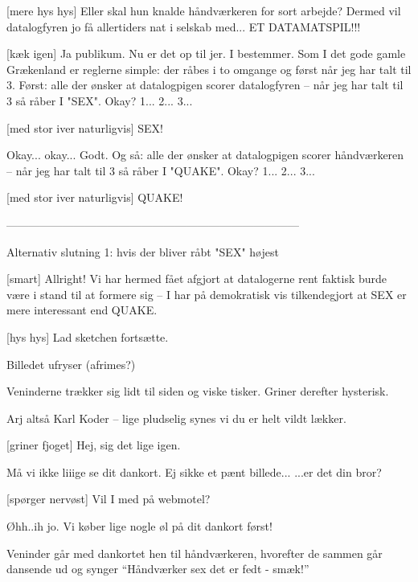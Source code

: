 \documentclass[danish]{article}
\begin{document}
\begin{sketch}
[mere hys hys] Eller skal hun knalde håndværkeren for sort arbejde?
Dermed vil datalogfyren jo få allertiders nat i selskab med...  ET DATAMATSPIL!!!

[kæk igen] Ja publikum. Nu er det op til jer. I bestemmer. Som I det
gode gamle Grækenland er reglerne simple: der råbes i to omgange og først
når jeg har talt til 3. Først: alle der ønsker at datalogpigen scorer
datalogfyren -- når jeg har talt til 3 så råber I "SEX". Okay? 1... 2...
3...

[med stor iver naturligvis] SEX! 

 Okay... okay... Godt. Og så: alle der ønsker at datalogpigen scorer
håndværkeren -- når jeg har talt til 3 så råber I "QUAKE". Okay? 1... 2...
3...

[med stor iver naturligvis] QUAKE! 

\scene ------------------------------------------------------------------------------

\scene Alternativ slutning 1: hvis der bliver råbt "SEX" højest

[smart] Allright! Vi har hermed fået afgjort at datalogerne rent
faktisk burde være i stand til at formere sig -- I har på demokratisk vis
tilkendegjort at SEX er mere interessant end QUAKE.

[hys hys] Lad sketchen fortsætte.

\scene Billedet ufryser (afrimes?)

\scene Veninderne trækker sig lidt til siden og viske tisker. Griner
derefter hysterisk.

 Arj altså Karl Koder -- lige pludselig synes vi du er helt vildt lækker.

[griner fjoget] Hej, sig det lige igen. 

 Må vi ikke liiige se dit dankort.  Ej sikke
et pænt billede... ...er det din bror? 

[spørger nervøst] Vil I med på webmotel?

 Øhh..ih jo. Vi køber lige nogle øl på dit dankort først!

\scene Veninder går med dankortet hen til håndværkeren, hvorefter de sammen
går dansende ud og synger ``Håndværker sex det er fedt - smæk!''


\end{sketch}
\end{document}
